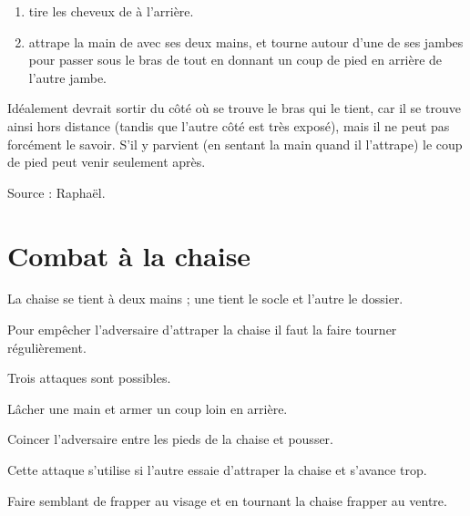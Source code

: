 \begin{technique}

\begin{enumerate}
	\item \A tire les cheveux de \D à l'arrière.
	
	\item \D attrape la main de \A avec ses deux mains, et tourne autour d'une de ses jambes pour passer sous le bras de \A tout en donnant un coup de pied en arrière de l'autre jambe.
\end{enumerate}

Idéalement \D devrait sortir du côté où se trouve le bras qui le tient, car il se trouve ainsi hors distance (tandis que l'autre côté est très exposé), mais il ne peut pas forcément le savoir.
S'il y parvient (en sentant la main quand il l'attrape) le coup de pied peut venir seulement après.

Source : Raphaël.
\end{technique}



\section{Combat à la chaise}

La chaise se tient à deux mains ; une tient le socle et l'autre le dossier.

Pour empêcher l'adversaire d'attraper la chaise il faut la faire tourner régulièrement.

Trois attaques sont possibles.

\begin{coup}
\label{coup:close-combat:chaise:frappe-armée}

Lâcher une main et armer un coup loin en arrière.
\end{coup}

\begin{coup}
\label{coup:close-combat:chaise:coincer}

Coincer l'adversaire entre les pieds de la chaise et pousser.

Cette attaque s'utilise si l'autre essaie d'attraper la chaise et s'avance trop.
\end{coup}

\begin{coup}
\label{coup:close-combat:chaise:coup-pied}

Faire semblant de frapper au visage et en tournant la chaise frapper au ventre.
\end{coup}


